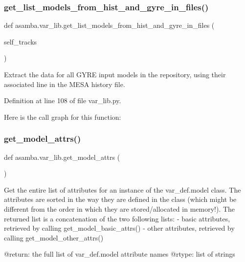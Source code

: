 \subsubsection{\texorpdfstring{get\+\_\+list\+\_\+models\+\_\+from\+\_\+hist\+\_\+and\+\_\+gyre\+\_\+in\+\_\+files()}{get\_list\_models\_from\_hist\_and\_gyre\_in\_files()}}
{\footnotesize\ttfamily def asamba.\+var\+\_\+lib.\+get\+\_\+list\+\_\+models\+\_\+from\+\_\+hist\+\_\+and\+\_\+gyre\+\_\+in\+\_\+files (\begin{DoxyParamCaption}\item[{}]{self\+\_\+tracks }\end{DoxyParamCaption})}

\begin{DoxyVerb}Extract the data for all GYRE input models in the repository, using their associated line in the 
MESA history file.
\end{DoxyVerb}
 

Definition at line 108 of file var\+\_\+lib.\+py.

Here is the call graph for this function\+:
\mbox{\label{namespaceasamba_1_1var__lib_a0c87523dbf5108a45ba622f3a931ea61}} 
\subsubsection{\texorpdfstring{get\+\_\+model\+\_\+attrs()}{get\_model\_attrs()}}
{\footnotesize\ttfamily def asamba.\+var\+\_\+lib.\+get\+\_\+model\+\_\+attrs (\begin{DoxyParamCaption}{ }\end{DoxyParamCaption})}

\begin{DoxyVerb}Get the entire list of attributes for an instance of the var_def.model class. The attributes are 
sorted in the way they are defined in the class (which might be different from the order in which 
they are stored/allocated in memory!). The returned list is a concatenation of the two following 
lists:
- basic attributes, retrieved by calling get_model_basic_attrs()
- other attributes, retrieved by calling get_model_other_attrs()

@return: the full list of var_def.model attribute names 
@rtype: list of strings
\end{DoxyVerb}
 


